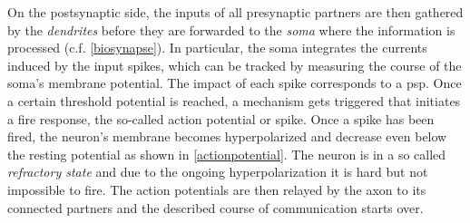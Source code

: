On the postsynaptic side, the inputs of all presynaptic partners are then gathered by the \emph{dendrites} before they are forwarded to the \emph{soma} where the information is processed (c.f. \cref{biosynapse}). In particular, the soma integrates the currents induced by the input spikes, which can be tracked by measuring the course of the soma's membrane potential. The impact of each spike corresponds to a \gls{psp}. Once a certain threshold potential is reached, a mechanism gets triggered that initiates a fire response, the so-called action potential or spike. Once a spike has been fired, the neuron's membrane becomes hyperpolarized and decrease even below the resting potential as shown in \cref{actionpotential}. The neuron is in a so called \emph{refractory state} and due to the ongoing hyperpolarization it is hard but not impossible to fire. The action potentials are then relayed by the axon to its connected partners and the described course of communication starts over. 

